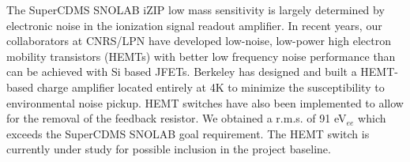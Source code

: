 \begin{compactitem}
	\item %
	The SuperCDMS SNOLAB iZIP low mass sensitivity is largely determined by electronic noise in the ionization signal readout amplifier. In recent years, our collaborators at CNRS/LPN have developed low-noise, low-power high electron mobility transistors (HEMTs) with better low frequency noise performance than can be achieved with Si based JFETs. Berkeley has designed and built a HEMT-based charge amplifier located entirely at 4K to minimize the susceptibility to environmental noise pickup. HEMT switches have also been implemented to allow for the removal of the feedback resistor. 
We obtained a r.m.s. of  91 eV$_{ee}$ %
which exceeds the SuperCDMS SNOLAB goal requirement. The HEMT switch is currently under study for possible inclusion in the project baseline.
		
\end{compactitem}

